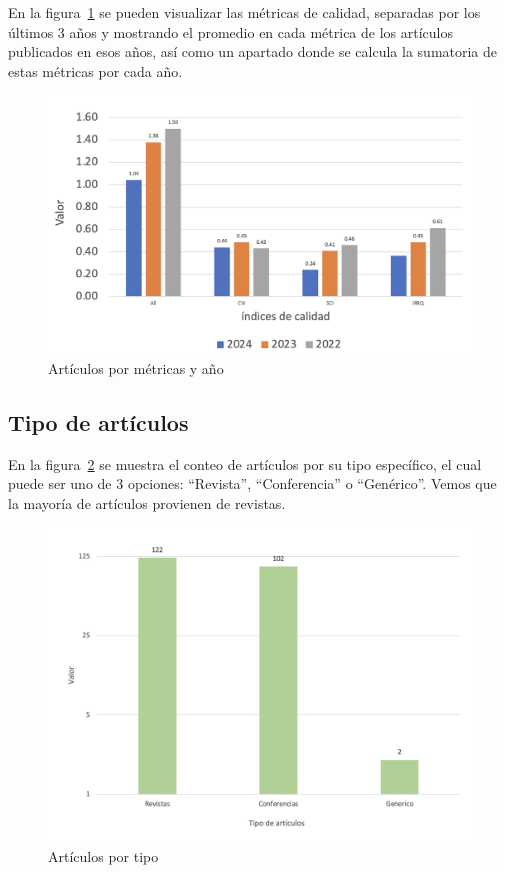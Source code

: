 \noindent
En la figura~\ref{fig:diagrama-articulos-ano-metrica} se pueden visualizar las métricas de calidad, separadas por los últimos 3 años y mostrando el promedio en cada métrica de los artículos publicados en esos años, así como un apartado donde se calcula la sumatoria de estas métricas por cada año.
\begin{figure}[H]
    \centering
    \includegraphics[scale=0.7]{tablas-images/cp2/diagrama-articulos-ano-metrica.png}
    \caption{Artículos por métricas y año}\label{fig:diagrama-articulos-ano-metrica}
\end{figure}
\noindent

\subsection{Tipo de artículos}
En la figura~\ref{fig:tipos-articulos} se muestra el conteo de artículos por su tipo específico, el cual puede ser uno de 3 opciones: ``Revista'', ``Conferencia'' o ``Genérico''. Vemos que la mayoría de artículos provienen de revistas.
\begin{figure}[H]
    \centering
    \includegraphics[scale=0.4]{tablas-images/cp2/tipos-articulos.png}
    \caption{Artículos por tipo}\label{fig:tipos-articulos}
\end{figure}
\noindent
